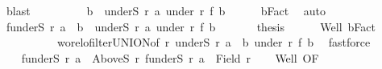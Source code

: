 \begin{isabellebody}
\ blast\isanewline
\ \ \ \ \isamarkupfalse%
\ \isamarkupfalse%
\ {\isachardoublequoteopen}{\isasymdots}\ {\isacharequal}{\kern0pt}\ {\isacharparenleft}{\kern0pt}{\isasymUnion}b\ {\isasymin}\ underS\ r\ a{\isachardot}{\kern0pt}\ {\isacharparenleft}{\kern0pt}under\ r{\isacharprime}{\kern0pt}\ {\isacharparenleft}{\kern0pt}f\ b{\isacharparenright}{\kern0pt}{\isacharparenright}{\kern0pt}{\isacharparenright}{\kern0pt}{\isachardoublequoteclose}\isanewline
\ \ \ \ \isamarkupfalse%
\ bFact\ \isamarkupfalse%
\ auto\isanewline
\ \ \ \ \isamarkupfalse%
\isanewline
\ \ \ \ \isamarkupfalse%
\ {\isachardoublequoteopen}f{\isacharbackquote}{\kern0pt}{\isacharparenleft}{\kern0pt}underS\ r\ a{\isacharparenright}{\kern0pt}\ {\isacharequal}{\kern0pt}\ {\isacharparenleft}{\kern0pt}{\isasymUnion}b\ {\isasymin}\ underS\ r\ a{\isachardot}{\kern0pt}\ {\isacharparenleft}{\kern0pt}under\ r{\isacharprime}{\kern0pt}\ {\isacharparenleft}{\kern0pt}f\ b{\isacharparenright}{\kern0pt}{\isacharparenright}{\kern0pt}{\isacharparenright}{\kern0pt}{\isachardoublequoteclose}\ \isacommand{{\isachardot}{\kern0pt}}\isamarkupfalse%
\isanewline
\ \ \ \ \isamarkupfalse%
\ {\isacharquery}{\kern0pt}thesis\isanewline
\ \ \ \ \isamarkupfalse%
\ Well{\isacharprime}{\kern0pt}\ bFact\isanewline
\ \ \ \ \ \ \ \ \ \ wo{\isacharunderscore}{\kern0pt}rel{\isachardot}{\kern0pt}ofilter{\isacharunderscore}{\kern0pt}UNION{\isacharbrackleft}{\kern0pt}of\ r{\isacharprime}{\kern0pt}\ {\isachardoublequoteopen}underS\ r\ a{\isachardoublequoteclose}\ {\isachardoublequoteopen}{\isasymlambda}\ b{\isachardot}{\kern0pt}\ under\ r{\isacharprime}{\kern0pt}\ {\isacharparenleft}{\kern0pt}f\ b{\isacharparenright}{\kern0pt}{\isachardoublequoteclose}{\isacharbrackright}{\kern0pt}\ \isamarkupfalse%
\ fastforce\isanewline
\ \ \isamarkupfalse%
\isanewline
\ \ \isanewline
\ \ \isamarkupfalse%
\ {\isachardoublequoteopen}f{\isacharbackquote}{\kern0pt}{\isacharparenleft}{\kern0pt}underS\ r\ a{\isacharparenright}{\kern0pt}\ {\isasymunion}\ AboveS\ r{\isacharprime}{\kern0pt}\ {\isacharparenleft}{\kern0pt}f{\isacharbackquote}{\kern0pt}{\isacharparenleft}{\kern0pt}underS\ r\ a{\isacharparenright}{\kern0pt}{\isacharparenright}{\kern0pt}\ {\isacharequal}{\kern0pt}\ Field\ r{\isacharprime}{\kern0pt}{\isachardoublequoteclose}\isanewline
\ \ \isamarkupfalse%
\ Well{\isacharprime}{\kern0pt}\ OF{\isacharprime}{\kern0pt}\ \isamarkupfalse%

\end{isabellebody}
